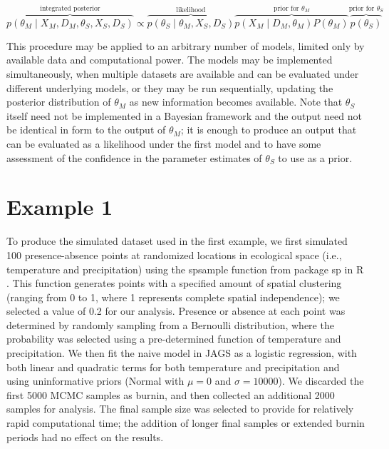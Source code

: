 \documentclass[11pt]{article}
\begin{document}
\begin{equation}
\label{eq:integrated2}
	\overbrace{p( \theta_M \mid X_M, D_M, \theta_S, X_S, D_S )}^\text{integrated posterior}
	\propto 
	\overbrace{p( \theta_S \mid \theta_M, X_S, D_S )}^\text{likelihood}
	\overbrace{p( X_M \mid D_M, \theta_M ) P( \theta_M )}^{\text{prior for } \theta_M}
	\overbrace{p(\theta_S)}^{\text{prior for } \theta_S}
\end{equation}

This procedure may be applied to an arbitrary number of models, limited only by available data and computational power. 
The models may be implemented simultaneously, when multiple datasets are available and can be evaluated under different underlying models, or they may be run sequentially, updating the posterior distribution of \(\theta_M\) as new information becomes available. 
Note that \(\theta_S\) itself need not be implemented in a Bayesian framework and the output need not be identical in form to the output of \(\theta_M\); it is enough to produce an output that can be evaluated as a likelihood under the first model and to have some assessment of the confidence in the parameter estimates of \(\theta_S\) to use as a prior.


\section*{Example 1}
To produce the simulated dataset used in the first example, we first simulated 100 presence-absence points at randomized locations in ecological space (i.e., temperature and precipitation) using the spsample function from package sp in R \citep{Bivand2013, R}.
This function generates points with a specified amount of spatial clustering (ranging from 0 to 1, where 1 represents complete spatial independence); we selected a value of 0.2 for our analysis.
Presence or absence at each point was determined by randomly sampling from a Bernoulli distribution, where the probability was selected using a pre-determined function of temperature and precipitation.
We then fit the naive model in JAGS as a logistic regression, with both linear and quadratic terms for both temperature and precipitation and using uninformative priors (Normal with \(\mu = 0\) and \(\sigma = 10000\)).
We discarded the first 5000 MCMC samples as burnin, and then collected an additional 2000 samples for analysis.
The final sample size was selected to provide for relatively rapid computational time; the addition of longer final samples or extended burnin periods had no effect on the results.
\end{document}
